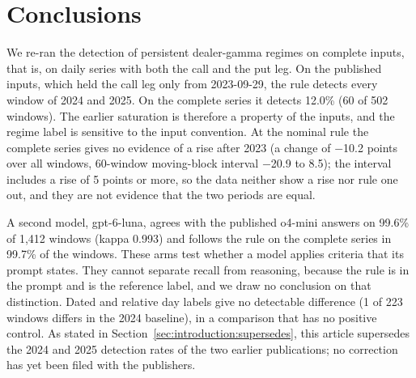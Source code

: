 \section{Conclusions}
\label{sec:conclusion}

We re-ran the detection of persistent dealer-gamma regimes on complete inputs, that is, on daily series with both the call and the put leg. On the published inputs, which held the call leg only from 2023-09-29, the rule detects every window of 2024 and 2025. On the complete series it detects 12.0\% (60 of 502 windows). The earlier saturation is therefore a property of the inputs, and the regime label is sensitive to the input convention. At the nominal rule the complete series gives no evidence of a rise after 2023 (a change of $-$10.2 points over all windows, 60-window moving-block interval $-$20.9 to 8.5); the interval includes a rise of 5 points or more, so the data neither show a rise nor rule one out, and they are not evidence that the two periods are equal.

A second model, gpt-6-luna, agrees with the published o4-mini answers on 99.6\% of 1{,}412 windows (kappa 0.993) and follows the rule on the complete series in 99.7\% of the windows. These arms test whether a model applies criteria that its prompt states. They cannot separate recall from reasoning, because the rule is in the prompt and is the reference label, and we draw no conclusion on that distinction. Dated and relative day labels give no detectable difference (1 of 223 windows differs in the 2024 baseline), in a comparison that has no positive control. As stated in Section~\ref{sec:introduction:supersedes}, this article supersedes the 2024 and 2025 detection rates of the two earlier publications; no correction has yet been filed with the publishers.

